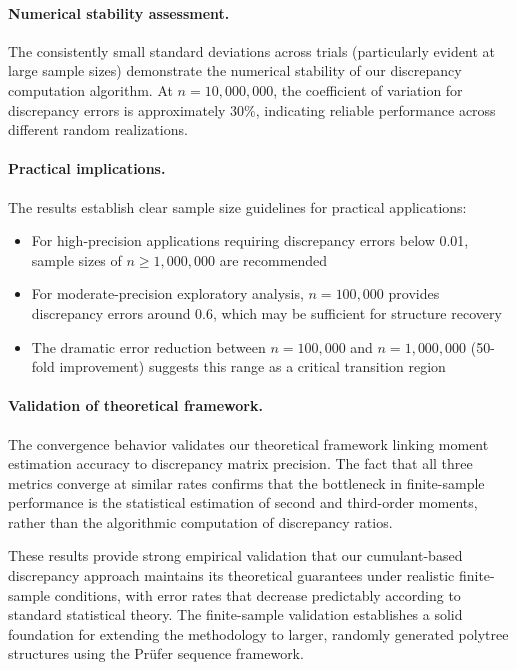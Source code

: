 \documentclass[11pt,a4paper]{article}
\numberwithin{equation}{section}
\begin{document}
\paragraph{Numerical stability assessment.} The consistently small standard deviations across trials (particularly evident at large sample sizes) demonstrate the numerical stability of our discrepancy computation algorithm. At $n = 10{,}000{,}000$, the coefficient of variation for discrepancy errors is approximately 30\%, indicating reliable performance across different random realizations.

\paragraph{Practical implications.} The results establish clear sample size guidelines for practical applications:
\begin{itemize}
\item For high-precision applications requiring discrepancy errors below 0.01, sample sizes of $n \geq 1{,}000{,}000$ are recommended
\item For moderate-precision exploratory analysis, $n = 100{,}000$ provides discrepancy errors around 0.6, which may be sufficient for structure recovery
\item The dramatic error reduction between $n = 100{,}000$ and $n = 1{,}000{,}000$ (50-fold improvement) suggests this range as a critical transition region
\end{itemize}

\paragraph{Validation of theoretical framework.} The convergence behavior validates our theoretical framework linking moment estimation accuracy to discrepancy matrix precision. The fact that all three metrics converge at similar rates confirms that the bottleneck in finite-sample performance is the statistical estimation of second and third-order moments, rather than the algorithmic computation of discrepancy ratios.

These results provide strong empirical validation that our cumulant-based discrepancy approach maintains its theoretical guarantees under realistic finite-sample conditions, with error rates that decrease predictably according to standard statistical theory. The finite-sample validation establishes a solid foundation for extending the methodology to larger, randomly generated polytree structures using the Prüfer sequence framework.
\end{document}

